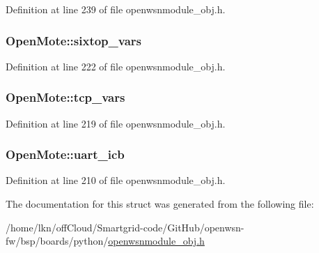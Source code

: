 Definition at line 239 of file openwsnmodule\+\_\+obj.\+h.

\subsubsection[{\texorpdfstring{sixtop\+\_\+vars}{sixtop_vars}}]{ Open\+Mote\+::sixtop\+\_\+vars}\hypertarget{struct_open_mote_ad24878ab2750f25cb31f1f1896df9129}{}\label{struct_open_mote_ad24878ab2750f25cb31f1f1896df9129}


Definition at line 222 of file openwsnmodule\+\_\+obj.\+h.

\subsubsection[{\texorpdfstring{tcp\+\_\+vars}{tcp_vars}}]{ Open\+Mote\+::tcp\+\_\+vars}\hypertarget{struct_open_mote_ae9aa5a246bdfe0db2d795dbf6acb9665}{}\label{struct_open_mote_ae9aa5a246bdfe0db2d795dbf6acb9665}


Definition at line 219 of file openwsnmodule\+\_\+obj.\+h.

\subsubsection[{\texorpdfstring{uart\+\_\+icb}{uart_icb}}]{ Open\+Mote\+::uart\+\_\+icb}\hypertarget{struct_open_mote_a4099b81ba7292a13c29f49b062a98ce6}{}\label{struct_open_mote_a4099b81ba7292a13c29f49b062a98ce6}


Definition at line 210 of file openwsnmodule\+\_\+obj.\+h.



The documentation for this struct was generated from the following file\+:\begin{DoxyCompactItemize}
\item 
/home/lkn/off\+Cloud/\+Smartgrid-\/code/\+Git\+Hub/openwsn-\/fw/bsp/boards/python/\hyperlink{openwsnmodule__obj_8h}{openwsnmodule\+\_\+obj.\+h}\end{DoxyCompactItemize}
